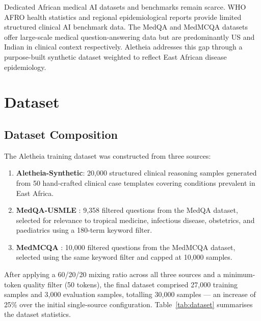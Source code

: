 \documentclass[journal]{IEEEtran}
\begin{document}
Dedicated African medical AI datasets and benchmarks remain scarce.
WHO AFRO health statistics \cite{afrihealth2023} and regional
epidemiological reports provide limited structured clinical AI benchmark data. The MedQA \cite{jin2021medqa} and
MedMCQA \cite{pmlr-v174-pal22a} datasets offer large-scale medical
question-answering data but are predominantly US and Indian in
clinical context respectively. Aletheia addresses this gap through
a purpose-built synthetic dataset weighted to reflect East African
disease epidemiology.

\section{Dataset}
\label{sec:dataset}

\subsection{Dataset Composition}

The Aletheia training dataset was constructed from three sources:

\begin{enumerate}
  \item \textbf{Aletheia-Synthetic}: 20{,}000 structured clinical
        reasoning samples generated from 50 hand-crafted clinical
        case templates covering conditions prevalent in East Africa.
  \item \textbf{MedQA-USMLE} \cite{jin2021medqa}: 9{,}358 filtered
        questions from the MedQA dataset, selected for relevance to
        tropical medicine, infectious disease, obstetrics, and
        paediatrics using a 180-term keyword filter.
  \item \textbf{MedMCQA} \cite{pmlr-v174-pal22a}: 10{,}000 filtered
        questions from the MedMCQA dataset, selected using the same
        keyword filter and capped at 10{,}000 samples.
\end{enumerate}

After applying a 60/20/20 mixing ratio across all three sources
and a minimum-token quality filter (50 tokens), the final dataset
comprised 27{,}000 training samples and 3{,}000 evaluation samples,
totalling 30{,}000 samples --- an increase of 25\% over the
initial single-source configuration.
Table~\ref{tab:dataset} summarises the dataset statistics.
\end{document}
